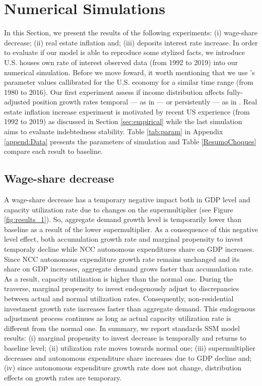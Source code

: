 \documentclass[11pt]{article}
\begin{document}
\section{Numerical Simulations}
\label{sec:org01411db}
\label{sec:Experiments}
\label{sec:Experiments}


In this Section, we present the results of the following experiments: 
    (i) wage-share decrease;
    (ii) real estate inflation and;
    (iii) deposits interest rate increase.
In order to evaluate if our model is able to reproduce some stylized facts, we introduce U.S. houses own rate of interest observed data (from 1992 to 2019) into our numerical simulation.
Before we move foward, it worth mentioning that we use \citeauthor*{fazzari-2020-deman-led}'s  \citeyear{fazzari-2020-deman-led} parameter values callibrated for the U.S. economy for a similar time range (from 1980 to 2016).
Our first experiment assess if income distribution affects fully-adjusted position growth rates temporal --- as in \textcite{mandarino-2020-worker-debt} --- or persistently ---  as in \textcite{brochier_supermultiplier_2018}.
Real estate inflation increase experiment is motivated by recent US experience (from 1992 to 2019) as discussed in Section \ref{sec:empirical} while the last simulation aims to evaluate indebtedness stability.
Table \ref{tab:param} in Appendix \ref{append:Data} presents the parameters of simulation and Table \ref{ResumoChoques} compare each result to baseline.
\subsection{Wage-share decrease}
\label{sec:org67b6e7f}
\label{sec:Exp1}

A wage-share decrease has a temporary negative impact both in GDP level and capacity utilization rate due to changes on the supermultiplier (see Figure \ref{fig:results_1}).
So, aggregate demand growth level is temporarily lower than baseline as a result of the lower supermultiplier.
As a consequence of this negative level effect, both accumulation growth rate and marginal propensity to invest temporaly decline while NCC autonomous expenditures share on GDP increases.
Since NCC autonomous expenditure growth rate remains unchanged and its share on GDP increases, aggregate demand grows faster than accumulation rate.
As a result, capacity utilization is higher than the normal one.
During the traverse, marginal propensity to invest endogenously adjust to discrepancies between actual and normal utilization rates.
Consequently, non-residential investment growth rate increases faster than aggregate demand.
This endogenous adjustment process continues as long as actual capacity utilization rate is different from the normal one.
In summary, we report standards SSM model results:
    (i) marginal propensity to invest decrease is temporally and returns to baseline level;
    (ii) utilization rate moves towards normal one;
    (iii) supermultiplier decreases and autonomous expenditure share increases due to GDP decline and; 
    (iv) since autonomous expenditure growth rate does not change, distribution effects on growth rates are temporary. 
\end{document}
